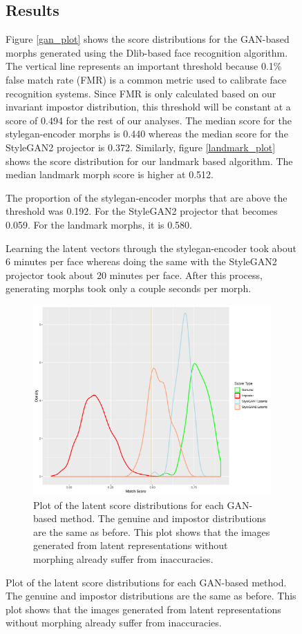 \documentclass[12pt]{article}
\begin{document}
\begin{figure}[t]
\subsection{Results}
\par %
Figure \ref{gan_plot} shows the score distributions for the GAN-based morphs generated using the Dlib-based face recognition algorithm. The vertical line represents an important threshold because 0.1\% false match rate (FMR) is a common metric used to calibrate face recognition systems. Since FMR is only calculated based on our invariant impostor distribution, this threshold will be constant at a score of 0.494 for the rest of our analyses. The median score for the stylegan-encoder morphs is 0.440 whereas the median score for the StyleGAN2 projector is 0.372. Similarly, figure \ref{landmark_plot} shows the score distribution for our landmark based algorithm. The median landmark morph score is higher at 0.512.
\par
The proportion of the stylegan-encoder morphs that are above the threshold was 0.192. For the StyleGAN2 projector that becomes 0.059. For the landmark morphs, it is 0.580.
\par
Learning the latent vectors through the stylegan-encoder took about 6 minutes per face whereas doing the same with the StyleGAN2 projector took about 20 minutes per face. After this process, generating morphs took only a couple seconds per morph.

\begin{figure}[t]
    \centering
    \includegraphics[width=0.8\linewidth]{dlib_fr_latent_hist.pdf}
    \caption{Plot of the latent score distributions for each GAN-based method. The genuine and impostor distributions are the same as before. This plot shows that the images generated from latent representations without morphing already suffer from inaccuracies.}
    \label{latent_plot}
\end{figure}

\end{figure}
\end{document}
